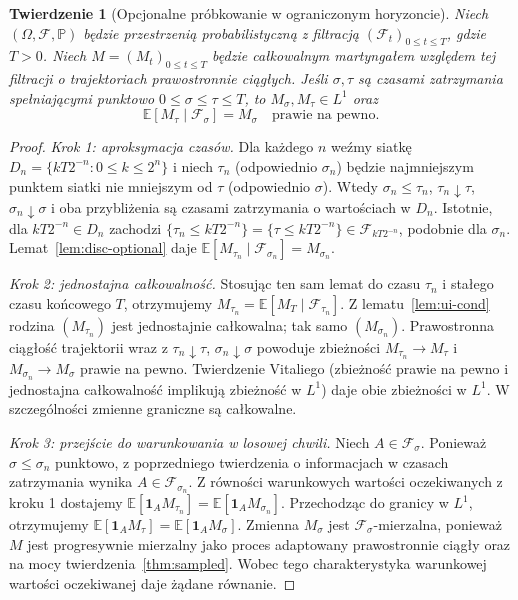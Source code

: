 \documentclass[11pt,a4paper,oneside]{report}
\numberwithin{equation}{chapter}
\theoremstyle{plain}
\newtheorem{twierdzenie}{Twierdzenie}[chapter]
\theoremstyle{definition}
\theoremstyle{remark}
\newcommand{\Prob}{\mathbb{P}}
\newcommand{\E}{\mathbb{E}}
\newcommand{\calF}{\mathcal{F}}
\newcommand{\ind}[1]{\mathbf{1}_{#1}}
\begin{document}
\begin{twierdzenie}[Opcjonalne próbkowanie w ograniczonym horyzoncie]
\label{thm:optional-cont}
Niech $(\Omega,\calF,\Prob)$ będzie przestrzenią
probabilistyczną z filtracją $(\calF_t)_{0\le t\le T}$,
gdzie $T>0$. Niech $M=(M_t)_{0\le t\le T}$
będzie całkowalnym martyngałem względem tej filtracji
o trajektoriach prawostronnie ciągłych.
Jeśli $\sigma,\tau$ są czasami zatrzymania spełniającymi
punktowo $0\le\sigma\le\tau\le T$,
to $M_\sigma,M_\tau\in L^1$ oraz
\[
\E[M_\tau\mid\calF_\sigma]=M_\sigma
\quad\text{prawie na pewno}.
\]
\end{twierdzenie}
\begin{proof}
\emph{Krok 1: aproksymacja czasów.}
Dla każdego $n$ weźmy siatkę $D_n=\{kT2^{-n}:0\le k\le2^n\}$
i niech $\tau_n$ (odpowiednio $\sigma_n$) będzie
najmniejszym punktem siatki nie mniejszym od $\tau$
(odpowiednio $\sigma$). Wtedy
$\sigma_n\le\tau_n$, $\tau_n\downarrow\tau$,
$\sigma_n\downarrow\sigma$ i oba przybliżenia są
czasami zatrzymania o wartościach w $D_n$.
Istotnie, dla $kT2^{-n}\in D_n$ zachodzi
$\{\tau_n\le kT2^{-n}\}=\{\tau\le kT2^{-n}\}\in\calF_{kT2^{-n}}$,
podobnie dla $\sigma_n$.
Lemat~\ref{lem:disc-optional} daje
$\E[M_{\tau_n}\mid\calF_{\sigma_n}]=M_{\sigma_n}$.

\emph{Krok 2: jednostajna całkowalność.}
Stosując ten sam lemat do czasu $\tau_n$ i
stałego czasu końcowego $T$, otrzymujemy
$M_{\tau_n}=\E[M_T\mid\calF_{\tau_n}]$.
Z lematu~\ref{lem:ui-cond} rodzina
$(M_{\tau_n})$ jest jednostajnie całkowalna;
tak samo $(M_{\sigma_n})$.
Prawostronna ciągłość trajektorii wraz z
$\tau_n\downarrow\tau$, $\sigma_n\downarrow\sigma$
powoduje zbieżności
$M_{\tau_n}\to M_\tau$ i
$M_{\sigma_n}\to M_\sigma$ prawie na pewno.
Twierdzenie Vitaliego (zbieżność prawie na pewno i
jednostajna całkowalność implikują zbieżność w $L^1$)
daje obie zbieżności w $L^1$. W szczególności
zmienne graniczne są całkowalne.

\emph{Krok 3: przejście do warunkowania w losowej chwili.}
Niech $A\in\calF_\sigma$. Ponieważ
$\sigma\le\sigma_n$ punktowo, z poprzedniego
twierdzenia o informacjach w czasach zatrzymania
wynika $A\in\calF_{\sigma_n}$. Z równości
warunkowych wartości oczekiwanych z kroku 1 dostajemy
$\E[\ind A M_{\tau_n}]=\E[\ind A M_{\sigma_n}]$.
Przechodząc do granicy w $L^1$, otrzymujemy
$\E[\ind A M_\tau]=\E[\ind A M_\sigma]$.
Zmienna $M_\sigma$ jest $\calF_\sigma$-mierzalna,
ponieważ $M$ jest progresywnie mierzalny jako
proces adaptowany prawostronnie ciągły oraz na mocy
twierdzenia~\ref{thm:sampled}.
Wobec tego charakterystyka warunkowej wartości
oczekiwanej daje żądane równanie.
\end{proof}
\end{document}
